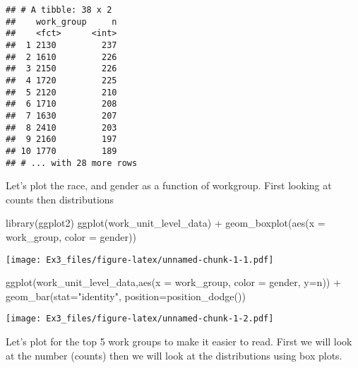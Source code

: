 \documentclass[
]{article}
\newenvironment{Shaded}{\begin{snugshade}}{\end{snugshade}}
\newcommand{\AttributeTok}[1]{\textcolor[rgb]{0.77,0.63,0.00}{#1}}
\newcommand{\DecValTok}[1]{\textcolor[rgb]{0.00,0.00,0.81}{#1}}
\newcommand{\FunctionTok}[1]{\textcolor[rgb]{0.00,0.00,0.00}{#1}}
\newcommand{\NormalTok}[1]{#1}
\newcommand{\OtherTok}[1]{\textcolor[rgb]{0.56,0.35,0.01}{#1}}
\newcommand{\SpecialCharTok}[1]{\textcolor[rgb]{0.00,0.00,0.00}{#1}}
\newcommand{\StringTok}[1]{\textcolor[rgb]{0.31,0.60,0.02}{#1}}
\begin{document}
\begin{verbatim}
## # A tibble: 38 x 2
##    work_group     n
##    <fct>      <int>
##  1 2130         237
##  2 1610         226
##  3 2150         226
##  4 1720         225
##  5 2120         210
##  6 1710         208
##  7 1630         207
##  8 2410         203
##  9 2160         197
## 10 1770         189
## # ... with 28 more rows
\end{verbatim}

Let's plot the race, and gender as a function of workgroup. First
looking at counts then distributions

\begin{Shaded}
\begin{Highlighting}[]
\FunctionTok{library}\NormalTok{(ggplot2)}
\FunctionTok{ggplot}\NormalTok{(work\_unit\_level\_data) }\SpecialCharTok{+}
  \FunctionTok{geom\_boxplot}\NormalTok{(}\FunctionTok{aes}\NormalTok{(}\AttributeTok{x =}\NormalTok{ work\_group, }\AttributeTok{color =}\NormalTok{ gender))}
\end{Highlighting}
\end{Shaded}

\texttt{[image: Ex3\_files/figure-latex/unnamed-chunk-1-1.pdf]}

\begin{Shaded}
\begin{Highlighting}[]
\FunctionTok{ggplot}\NormalTok{(work\_unit\_level\_data,}\FunctionTok{aes}\NormalTok{(}\AttributeTok{x =}\NormalTok{ work\_group, }\AttributeTok{color =}\NormalTok{ gender, }\AttributeTok{y=}\NormalTok{n)) }\SpecialCharTok{+}
  \FunctionTok{geom\_bar}\NormalTok{(}\AttributeTok{stat=}\StringTok{"identity"}\NormalTok{, }\AttributeTok{position=}\FunctionTok{position\_dodge}\NormalTok{())}
\end{Highlighting}
\end{Shaded}

\texttt{[image: Ex3\_files/figure-latex/unnamed-chunk-1-2.pdf]}

Let's plot for the top 5 work groups to make it easier to read. First we
will look at the number (counts) then we will look at the distributions
using box plots.

\begin{Shaded}
\end{Shaded}
\end{document}
